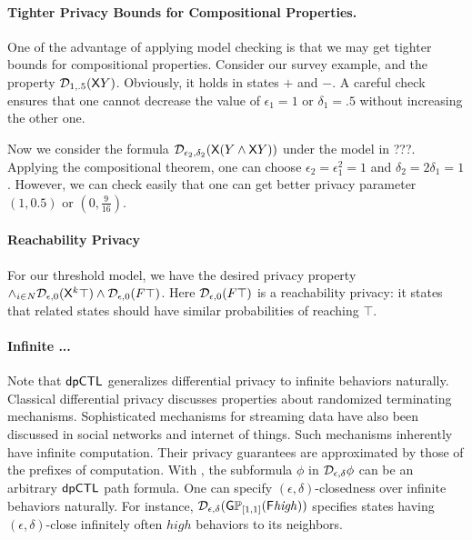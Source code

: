 \paragraph{Tighter Privacy Bounds for Compositional Properties.}
One of the advantage of applying model checking is that we may get tighter bounds for compositional properties. Consider our survey example, and the property $\mathcal{D}_{{1}, {.5}} (\mathsf{X} Y)$. Obviously, it holds in states $+$ and $-$. A careful check ensures that one cannot decrease the value of $\epsilon_1=1$ or $\delta_1=.5$ without increasing the other one.


Now we consider the formula $\mathcal{D}_{{\epsilon_2}, {\delta_2}} (\mathsf{X} (Y\wedge \mathsf{X} Y))$ under the model in ???. Applying the compositional theorem, one can choose $\epsilon_2=\epsilon_1^2=1$ and $\delta_2=2\delta_1=1$. However, we can check easily that one can get better privacy parameter $(1,0.5)$ or $(0,\frac{9}{16})$.

\paragraph{Reachability Privacy} 
For our threshold  model, we have the desired privacy property $\wedge_{i\in N} \mathcal{D}_{{\epsilon}, {0}}(\mathsf{X}^k \top) \wedge \mathcal{D}_{{\epsilon}, {0}}(F \top)$. Here $\mathcal{D}_{{\epsilon}, {0}}(F \top)$ is a reachability privacy: it states that related states should have similar probabilities of reaching $\top$. 

\paragraph{Infinite ...}
Note that $\textsf{dpCTL}$ generalizes differential privacy to infinite
behaviors naturally. Classical differential privacy discusses properties about
randomized terminating mechanisms. Sophisticated mechanisms for
streaming data have also been discussed in social networks and
internet of things. Such mechanisms inherently have infinite
computation. Their privacy guarantees are approximated by those of the
prefixes of computation.
With \dpCTL, the subformula $\phi$ in $\mathcal{D}_{{\epsilon}, {\delta}} \phi$
can be an arbitrary $\textsf{dpCTL}$ path formula. One can specify
$(\epsilon, \delta)$-closedness over infinite behaviors naturally. For instance,
$\mathcal{D}_{{\epsilon}, {\delta}} (\mathsf{G} \mathbb{P}_{[1,1]} (\mathsf{F} \mathit{high}))$ 
specifies states having $(\epsilon, \delta)$-close
infinitely often $\mathit{high}$ behaviors to its neighbors.
